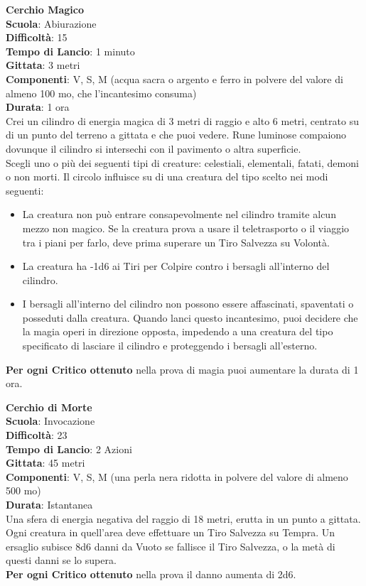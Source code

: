 \begin{multicols}{2}
\medskip\textbf{Cerchio Magico}\\
\textbf{Scuola}: Abiurazione\\
\textbf{Difficoltà}:  15\\
\textbf{Tempo di Lancio}: 1 minuto\\
\textbf{Gittata}: 3 metri\\
\textbf{Componenti}: V, S, M (acqua sacra o argento e ferro in polvere del valore di almeno 100 mo, che l'incantesimo consuma)\\
\textbf{Durata}: 1 ora\\
Crei un cilindro di energia magica di 3 metri di raggio e alto 6 metri, centrato su di un punto del terreno a gittata e che puoi vedere. Rune luminose compaiono dovunque il cilindro si intersechi con il pavimento o altra superficie.\\
Scegli uno o più dei seguenti tipi di creature: celestiali, elementali, fatati, demoni o non morti. Il circolo influisce su di una creatura del tipo scelto nei modi seguenti:\\
\begin{itemize}
	\item 
La creatura non può entrare consapevolmente nel cilindro tramite alcun mezzo non magico. Se la creatura prova a usare il teletrasporto o il viaggio tra i piani per farlo, deve prima superare un Tiro Salvezza su Volontà.
	\item 
La creatura ha -1d6 ai Tiri per Colpire contro i bersagli all'interno del cilindro.
	\item 
I bersagli all'interno del cilindro non possono essere affascinati, spaventati o posseduti dalla creatura. Quando lanci questo incantesimo, puoi decidere che la magia operi in direzione opposta, impedendo a una creatura del tipo specificato di lasciare il cilindro e proteggendo i bersagli all'esterno.
\end{itemize}
\textbf{Per ogni Critico ottenuto} nella prova di magia puoi aumentare la durata di 1 ora.

\medskip\textbf{Cerchio di Morte}\\
\textbf{Scuola}: Invocazione\\
\textbf{Difficoltà}:  23\\
\textbf{Tempo di Lancio}: 2 Azioni\\
\textbf{Gittata}: 45 metri\\
\textbf{Componenti}: V, S, M (una perla nera ridotta in polvere del valore di almeno 500 mo)\\
\textbf{Durata}: Istantanea\\
Una sfera di energia negativa del raggio di 18 metri, erutta in un punto a gittata. Ogni creatura in quell'area deve effettuare un Tiro Salvezza su Tempra. Un  ersaglio subisce 8d6 danni da Vuoto se fallisce il Tiro Salvezza, o la metà di questi danni se lo supera. \\
\textbf{Per ogni Critico ottenuto} nella prova il danno aumenta di 2d6.


\end{multicols}
